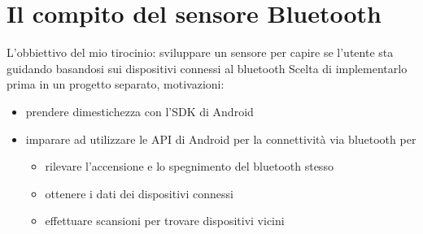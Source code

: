 \section{Il compito del sensore Bluetooth}
L'obbiettivo del mio tirocinio: sviluppare un sensore per capire se l'utente sta guidando basandosi sui dispositivi connessi al bluetooth
Scelta di implementarlo prima in un progetto separato, motivazioni:
\begin{itemize}
    \item prendere dimestichezza con l'SDK di Android
    \item imparare ad utilizzare le API di Android per la connettività via bluetooth per
    \begin{itemize}
        \item rilevare l'accensione e lo spegnimento del bluetooth stesso
        \item ottenere i dati dei dispositivi connessi
        \item effettuare scansioni per trovare dispositivi vicini
    \end{itemize}
\end{itemize}
